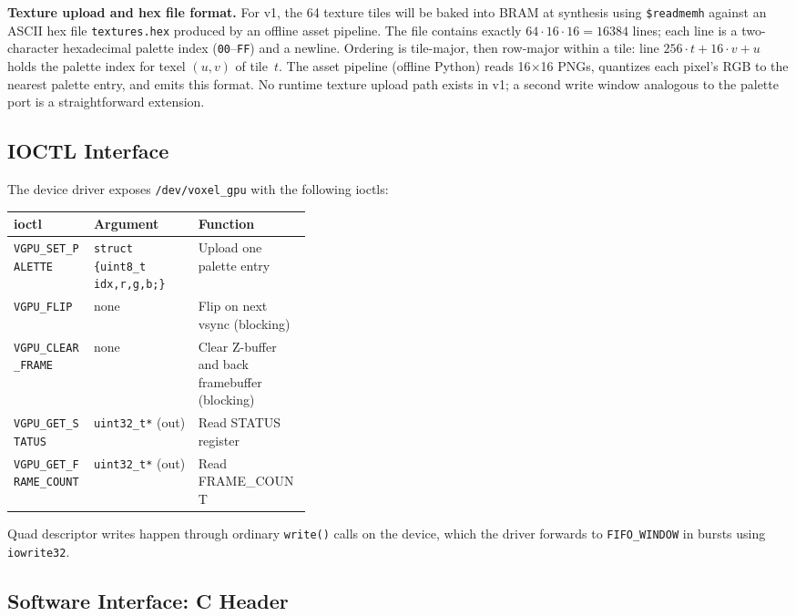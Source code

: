 \documentclass[11pt]{article}
\begin{document}
\noindent\textbf{Texture upload and hex file format.} For v1, the 64 texture tiles will be baked into BRAM at synthesis using \texttt{\$readmemh} against an ASCII hex file \texttt{textures.hex} produced by an offline asset pipeline. The file contains exactly $64 \cdot 16 \cdot 16 = 16384$ lines; each line is a two-character hexadecimal palette index (\texttt{00}--\texttt{FF}) and a newline. Ordering is tile-major, then row-major within a tile: line $256 \cdot t + 16 \cdot v + u$ holds the palette index for texel $(u,v)$ of tile~$t$. The asset pipeline (offline Python) reads 16$\times$16 PNGs, quantizes each pixel's RGB to the nearest palette entry, and emits this format. No runtime texture upload path exists in v1; a second write window analogous to the palette port is a straightforward extension.

\subsection{IOCTL Interface}
\label{sec:ioctl}

The device driver exposes \texttt{/dev/voxel\_gpu} with the following ioctls:

\begin{center}
\small
\begin{tabular}{llp{0.38\linewidth}}
\toprule
\textbf{ioctl} & \textbf{Argument} & \textbf{Function} \\
\midrule
\texttt{VGPU\_SET\_PALETTE}   & \texttt{struct \{uint8\_t idx,r,g,b;\}} & Upload one palette entry \\
\texttt{VGPU\_FLIP}           & none                          & Flip on next vsync (blocking) \\
\texttt{VGPU\_CLEAR\_FRAME}   & none                          & Clear Z-buffer and back framebuffer (blocking) \\
\texttt{VGPU\_GET\_STATUS}    & \texttt{uint32\_t*} (out)      & Read STATUS register \\
\texttt{VGPU\_GET\_FRAME\_COUNT} & \texttt{uint32\_t*} (out)  & Read FRAME\_COUNT \\
\bottomrule
\end{tabular}
\end{center}

Quad descriptor writes happen through ordinary \texttt{write()} calls on the device, which the driver forwards to \texttt{FIFO\_WINDOW} in bursts using \texttt{iowrite32}.

\subsection{Software Interface: C Header}
\label{sec:header}
\end{document}
